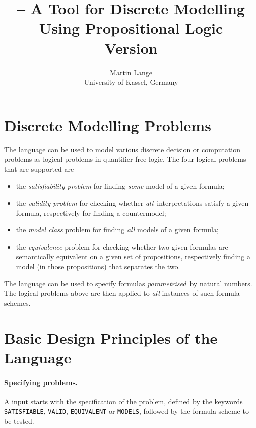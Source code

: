 \documentclass[twoside]{article}
\title{\DiMo -- A Tool for Discrete Modelling Using Propositional Logic \\ Version \DiMoVersion}
\author{Martin Lange \\ University of Kassel, Germany}
\begin{document}
\maketitle

\tableofcontents

\section{Discrete Modelling Problems}

The \DiMo language can be used to model various discrete decision or computation problems as logical problems in quantifier-free logic.
The four logical problems that are supported are
\begin{itemize}
\item the \emph{satisfiability problem} for finding \emph{some} model of a given formula;
\item the \emph{validity problem} for checking whether \emph{all} interpretations satisfy a given formula, respectively for finding
      a countermodel;
\item the \emph{model class} problem for finding \emph{all} models of a given formula;
\item the \emph{equivalence} problem for checking whether two given formulas are semantically equivalent on a given set of propositions, 
      respectively finding a model (in those propositions) that separates the two.
\end{itemize}
The \DiMo language can be used to specify formulas \emph{parametrised} by natural numbers. The logical problems above are then applied
to \emph{all} instances of such formula schemes. 


\section{Basic Design Principles of the Language}

\paragraph*{Specifying problems.} 
A \DiMo input starts with the specification of the problem, defined by the keywords \texttt{SATISFIABLE}, \texttt{VALID}, 
\texttt{EQUIVALENT} or \texttt{MODELS}, followed by the formula scheme to be tested. 
\end{document}

